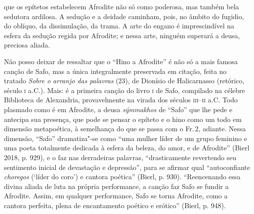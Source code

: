 {que os epítetos estabelecem Afrodite não só como poderosa, mas também bela
sedutora ardilosa. A sedução e a deidade caminham, pois, no âmbito do fugidio,
do oblíquo, da dissimulação, da trama. A arte do engano é imprescindível na
esfera da sedução regida por Afrodite; e nessa arte, ninguém superará a deusa,
preciosa aliada.

Não posso deixar de ressaltar que o “Hino a Afrodite” é não só
a mais famosa canção de Safo, mas a única integralmente preservada em citação, feita no tratado \textit{Sobre o arranjo das palavras} (23), de Dionísio de Halicarnasso (retórico, século \textsc{i} a.C.). Mais: é a primeira canção do livro \textsc{i} de Safo,
compilado na célebre Biblioteca de Alexandria, provavelmente na virada dos
séculos \textsc{iii}--\textsc{ii} a.C.
Todo plasmado como é em Afrodite, a deusa \textit{sýmmakhos} de ``Safo'' que lhe pede e antecipa sua presença, que pode se pensar o epíteto e o hino como um todo em dimensão metapoética, à semelhança do que se passa com o Fr.\,2, adiante. Nessa dimensão, ``Safo'' dramatiza"-se como ``uma mulher líder de um grupo feminino e uma poeta totalmente dedicada à esfera da beleza, do amor, e de Afrodite'' (Bierl 2018, p. 929), e o faz nas derradeiras palavras, “drasticamente revertendo seu sentimento inicial de devastação e depressão”, para se afirmar qual “autoconfiante \textit{choregos} (‘líder do coro’) e cantora poética” (Bierl, p. 930). “Reencenando essa divina aliada de luta na própria performance, a canção faz Safo se fundir a Afrodite. Assim, em qualquer performance, Safo se torna Afrodite, como a cantora perfeita, plena de encantamento poético e erótico” (Bierl, p. 948).}


